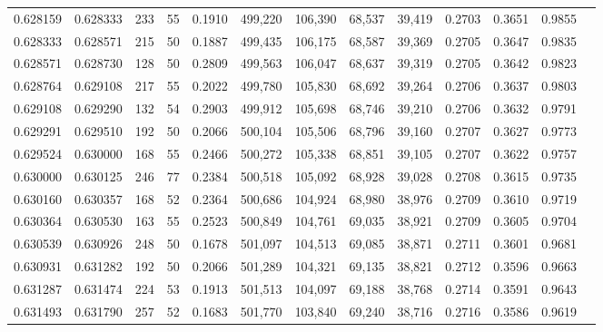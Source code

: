 \begin{tabular}{rrrrrrrrrrrrr}
0.628159 & 0.628333 &    233 &    55 &                                     0.1910 & 499,220 & 106,390 &  68,537 &  39,419 & 0.2703 & 0.3651 & 0.9855 \\
0.628333 & 0.628571 &    215 &    50 &                                     0.1887 & 499,435 & 106,175 &  68,587 &  39,369 & 0.2705 & 0.3647 & 0.9835 \\
0.628571 & 0.628730 &    128 &    50 &                                     0.2809 & 499,563 & 106,047 &  68,637 &  39,319 & 0.2705 & 0.3642 & 0.9823 \\
0.628764 & 0.629108 &    217 &    55 &                                     0.2022 & 499,780 & 105,830 &  68,692 &  39,264 & 0.2706 & 0.3637 & 0.9803 \\
0.629108 & 0.629290 &    132 &    54 &                                     0.2903 & 499,912 & 105,698 &  68,746 &  39,210 & 0.2706 & 0.3632 & 0.9791 \\
0.629291 & 0.629510 &    192 &    50 &                                     0.2066 & 500,104 & 105,506 &  68,796 &  39,160 & 0.2707 & 0.3627 & 0.9773 \\
0.629524 & 0.630000 &    168 &    55 &                                     0.2466 & 500,272 & 105,338 &  68,851 &  39,105 & 0.2707 & 0.3622 & 0.9757 \\
0.630000 & 0.630125 &    246 &    77 &                                     0.2384 & 500,518 & 105,092 &  68,928 &  39,028 & 0.2708 & 0.3615 & 0.9735 \\
0.630160 & 0.630357 &    168 &    52 &                                     0.2364 & 500,686 & 104,924 &  68,980 &  38,976 & 0.2709 & 0.3610 & 0.9719 \\
0.630364 & 0.630530 &    163 &    55 &                                     0.2523 & 500,849 & 104,761 &  69,035 &  38,921 & 0.2709 & 0.3605 & 0.9704 \\
0.630539 & 0.630926 &    248 &    50 &                                     0.1678 & 501,097 & 104,513 &  69,085 &  38,871 & 0.2711 & 0.3601 & 0.9681 \\
0.630931 & 0.631282 &    192 &    50 &                                     0.2066 & 501,289 & 104,321 &  69,135 &  38,821 & 0.2712 & 0.3596 & 0.9663 \\
0.631287 & 0.631474 &    224 &    53 &                                     0.1913 & 501,513 & 104,097 &  69,188 &  38,768 & 0.2714 & 0.3591 & 0.9643 \\
0.631493 & 0.631790 &    257 &    52 &                                     0.1683 & 501,770 & 103,840 &  69,240 &  38,716 & 0.2716 & 0.3586 & 0.9619 \\

\end{tabular}
